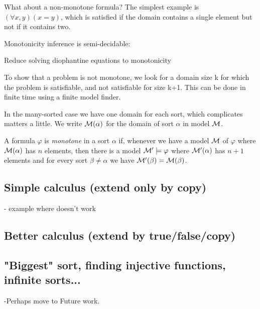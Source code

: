 What about a non-monotone formula? The simplest example is $(\forall
x, y)(x = y)$, which is satisfied if the domain contains a single
element but not if it contains two.





Monotonicity inference is semi-decidable:

Reduce solving diophantine equations to monotonicity

To show that a problem is not monotone, we look for a domain size
k for which the problem is satisfiable, and not satisfiable for size k+1.
This can be done in finite time using a finite model finder.



In the many-sorted case we have one domain for each sort, which
complicates matters a little. We write $\mathcal{M}(\alpha)$ for the domain of
sort $\alpha$ in model $\mathcal{M}$.

\begin{definition}
A formula $\varphi$ is \emph{monotone} in a sort $\alpha$ if,
whenever we have a model $\mathcal{M}$ of $\varphi$ where $\mathcal{M}(\alpha)$ has $n$
elements, then there is a model $\mathcal{M}' \models \varphi$ where
$\mathcal{M}'(\alpha)$ has $n+1$ elements and for every sort $\beta \neq
\alpha$ we have $\mathcal{M}'(\beta) = \mathcal{M}(\beta)$.
\end{definition}

\subsection{Simple calculus (extend only by copy)}

- example where doesn't work

\subsection{Better calculus (extend by true/false/copy)}

\subsection{ "Biggest" sort, finding injective functions, infinite sorts...}

-Perhaps move to Future work.
